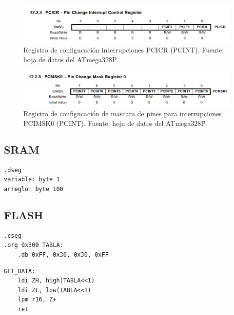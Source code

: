     \begin{figure}[H]
    \centering
    \includegraphics[width=\linewidth]{./Anexos/Marco Teorico/External Interrupts/PCICR.png}
    \caption{Registro de configucación interrupciones PCICR (PCINT). Fuente: hoja de datos del ATmega328P\@\cite{atmega328p_datasheet}.}
    \label{fig:PCICR}
    \end{figure}

    \begin{figure}[H]
    \centering
    \includegraphics[width=\linewidth]{./Anexos/Marco Teorico/External Interrupts/PCMSK.png}
    \caption{Registro de configucación de mascara de pines para interrupciones PCIMSK0 (PCINT). Fuente: hoja de datos del ATmega328P\@\cite{atmega328p_datasheet}.}
    \label{fig:PCIMSK}
    \end{figure}

\subsection{SRAM}\label{anexo:SRAM}

\begin{verbatim}
.dseg
variable: byte 1  
arreglo: byte 100
\end{verbatim}


\subsection{FLASH}\label{anexo:FLASH}

\begin{verbatim}
.cseg
.org 0x300 TABLA:
    .db 0xFF, 0x30, 0x30, 0xFF
\end{verbatim}

\begin{verbatim}
GET_DATA:
    ldi ZH, high(TABLA<<1)
    ldi ZL, low(TABLA<<1)
    lpm r16, Z+
    ret
\end{verbatim}

